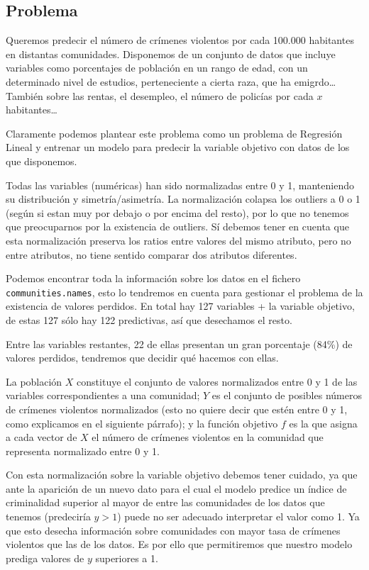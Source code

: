 \documentclass[a4]{article}
\begin{document}
\subsection{Problema}

Queremos predecir el número de crímenes violentos por cada 100.000
habitantes en distantas comunidades. Disponemos de un conjunto de
datos que incluye variables como porcentajes de población en un rango
de edad, con un determinado nivel de estudios, perteneciente a cierta
raza, que ha emigrdo\ldots También sobre las rentas, el desempleo, el
número de policías por cada $x$ habitantes\ldots

Claramente podemos plantear este problema como un problema de
Regresión Lineal y entrenar un modelo para predecir la variable
objetivo con datos de los que disponemos.

Todas las variables (numéricas) han sido normalizadas entre 0 y 1,
manteniendo su distribución y simetría/asimetría. La normalización
colapsa los outliers a 0 o 1 (según si estan muy por debajo o por
encima del resto), por lo que no tenemos que preocuparnos por la
existencia de outliers. Sí debemos tener en cuenta que esta
normalización preserva los ratios entre valores del mismo atributo,
pero no entre atributos, no tiene sentido comparar dos atributos
diferentes.

Podemos encontrar toda la información sobre los datos en el fichero
\texttt{communities.names}, esto lo tendremos en cuenta para gestionar
el problema de la existencia de valores perdidos. En total hay 127
variables + la variable objetivo, de estas 127 sólo hay 122
predictivas, así que desechamos el resto.

Entre las variables restantes, 22 de ellas presentan un gran
porcentaje (84\%) de valores perdidos, tendremos que decidir qué
hacemos con ellas.

La población $X$ constituye el conjunto de valores normalizados entre
0 y 1 de las variables correspondientes a una comunidad; $Y$ es el
conjunto de posibles números de crímenes violentos normalizados (esto
no quiere decir que estén entre 0 y 1, como explicamos en el siguiente
párrafo); y la función objetivo $f$ es la que asigna a cada vector de
$X$ el número de crímenes violentos en la comunidad que representa
normalizado entre 0 y 1.

Con esta normalización sobre la variable objetivo debemos tener
cuidado, ya que ante la aparición de un nuevo dato para el cual el
modelo predice un índice de criminalidad superior al mayor de entre
las comunidades de los datos que tenemos (predeciría $y>1$) puede no
ser adecuado interpretar el valor como 1. Ya que esto desecha
información sobre comunidades con mayor tasa de crímenes violentos que
las de los datos. Es por ello que permitiremos que nuestro modelo
prediga valores de $y$ superiores a 1.
\end{document}
